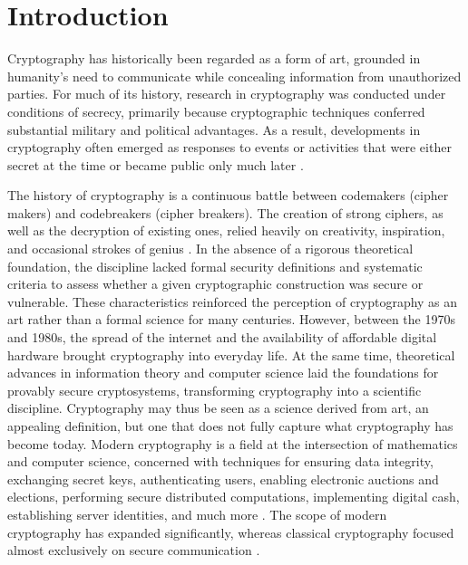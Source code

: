 \chapter{Introduction}
\lhead[\fancyplain{}{\bfseries\thepage}]{\fancyplain{}{\bfseries\rightmark}}

Cryptography has historically been regarded as a form of art, grounded in humanity's need to communicate while concealing information from unauthorized parties. For much of its history, research in cryptography was conducted under conditions of secrecy, primarily because cryptographic techniques conferred substantial military and political advantages. As a result, developments in cryptography often emerged as responses to events or activities that were either secret at the time or became public only much later \cite{the-code-book}.

The history of cryptography is a continuous battle between codemakers (cipher makers) and codebreakers (cipher breakers). The creation of strong ciphers, as well as the decryption of existing ones, relied heavily on creativity, inspiration, and occasional strokes of genius \cite{introduction-to-modern-cryptography}. In the absence of a rigorous theoretical foundation, the discipline lacked formal security definitions and systematic criteria to assess whether a given cryptographic construction was secure or vulnerable. These characteristics reinforced the perception of cryptography as an art rather than a formal science for many centuries. However, between the 1970s and 1980s, the spread of the internet and the availability of affordable digital hardware brought cryptography into everyday life. At the same time, theoretical advances \cite{new-directions-in-cryptography, a-method-for-obtaining-digital-signatures, probabilistic-encryption} in information theory and computer science laid the foundations for provably secure cryptosystems, transforming cryptography into a scientific discipline. Cryptography may thus be seen as a science derived from art, an appealing definition, but one that does not fully capture what cryptography has become today. Modern cryptography is a field at the intersection of mathematics and computer science, concerned with techniques for ensuring data integrity, exchanging secret keys, authenticating users, enabling electronic auctions and elections, performing secure distributed computations, implementing digital cash, establishing server identities, and much more \cite{introduction-to-modern-cryptography}. The scope of modern cryptography has expanded significantly, whereas classical cryptography focused almost exclusively on secure communication \cite{theory-of-computing}. 

